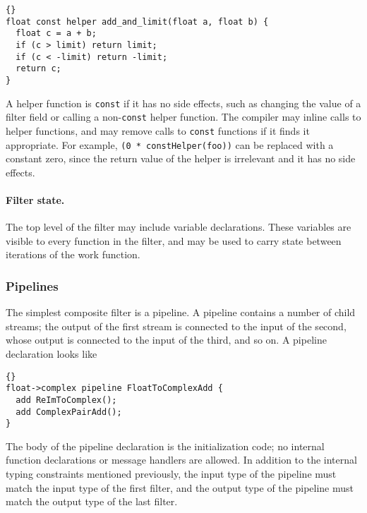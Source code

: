 \documentclass[11pt]{article}
\begin{document}
\begin{lstlisting}{}
float const helper add_and_limit(float a, float b) {
  float c = a + b;
  if (c > limit) return limit;
  if (c < -limit) return -limit;
  return c;
}
\end{lstlisting}

A helper function is \lstinline|const| if it has no side effects, such
as changing the value of a filter field or calling a
non-\lstinline|const| helper function.  The compiler may inline calls
to helper functions, and may remove calls to \lstinline|const|
functions if it finds it appropriate.  For example,
\lstinline|(0 * constHelper(foo))| can be replaced with a constant
zero, since the return value of the helper is irrelevant and it has no
side effects.

\paragraph{Filter state.}  The top level of the filter may include
variable declarations.  These variables are visible to every function
in the filter, and may be used to carry state between iterations of
the work function.


\subsubsection{Pipelines}

The simplest composite filter is a pipeline.  A pipeline contains a
number of child streams; the output of the first stream is connected
to the input of the second, whose output is connected to the input of
the third, and so on.  A pipeline declaration looks like

\begin{lstlisting}{}
float->complex pipeline FloatToComplexAdd {
  add ReImToComplex();
  add ComplexPairAdd();
}
\end{lstlisting}

The body of the pipeline declaration is the initialization code; no
internal function declarations or message handlers are allowed.  In
addition to the internal typing constraints mentioned previously, the
input type of the pipeline must match the input type of the first
filter, and the output type of the pipeline must match the output type
of the last filter.
\end{document}
